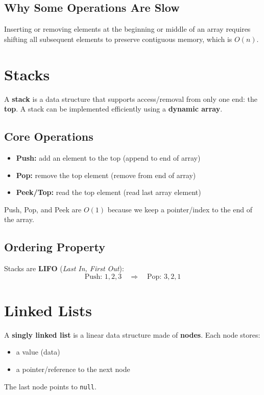 \documentclass{article}
\begin{document}
\subsection{Why Some Operations Are Slow}
Inserting or removing elements at the beginning or middle of an array requires shifting all subsequent elements to preserve contiguous memory, which is $O(n)$.

\section{Stacks}

A \textbf{stack} is a data structure that supports access/removal from only one end: the \textbf{top}.  
A stack can be implemented efficiently using a \textbf{dynamic array}.

\subsection{Core Operations}
\begin{itemize}
  \item \textbf{Push:} add an element to the top (append to end of array)
  \item \textbf{Pop:} remove the top element (remove from end of array)
  \item \textbf{Peek/Top:} read the top element (read last array element)
\end{itemize}
Push, Pop, and Peek are \textbf{$O(1)$} because we keep a pointer/index to the end of the array.

\subsection{Ordering Property}
Stacks are \textbf{LIFO} (\textit{Last In, First Out}):
\[
\text{Push: } 1,2,3 \quad \Rightarrow \quad \text{Pop: } 3,2,1
\]

\section{Linked Lists}

A \textbf{singly linked list} is a linear data structure made of \textbf{nodes}.  
Each node stores:
\begin{itemize}
  \item a value (data)
  \item a pointer/reference to the next node
\end{itemize}

The last node points to \texttt{null}.
\end{document}
